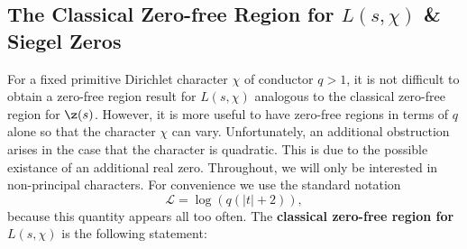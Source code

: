     \subsection*{The Classical Zero-free Region for \texorpdfstring{$L(s,\chi)$}{L(s,\chi)} \& Siegel Zeros}
      For a fixed primitive Dirichlet character $\chi$ of conductor $q > 1$, it is not difficult to obtain a zero-free region result for $L(s,\chi)$ analogous to the classical zero-free region for $\z(s)$. However, it is more useful to have zero-free regions in terms of $q$ alone so that the character $\chi$ can vary. Unfortunately, an additional obstruction arises in the case that the character is quadratic. This is due to the possible existance of an additional real zero. Throughout, we will only be interested in non-principal characters. For convenience we use the standard notation
      \[
        \mathscr{L} = \log(q(|t|+2)),
      \]
      because this quantity appears all too often. The \textbf{classical zero-free region for $L(s,\chi)$} is the following statement:

